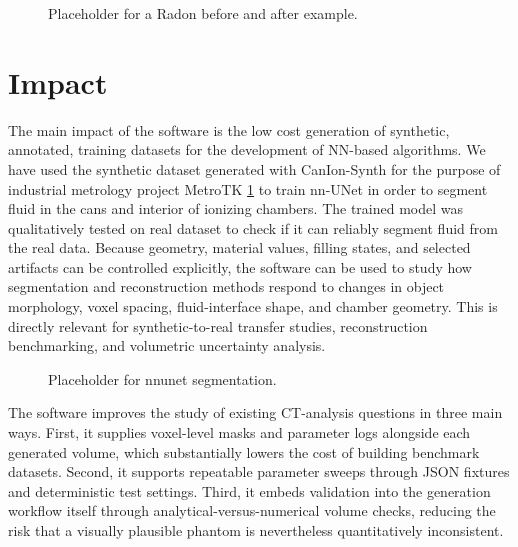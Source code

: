 \documentclass[preprint,12pt, a4paper]{elsarticle}
\begin{document}
\begin{figure}[!h]
\centering
{}
\caption{Placeholder for a Radon before and after example.}
\label{fig: radon_example}
\end{figure}


\section{Impact}
The main impact of the software is the low cost generation of synthetic, annotated, training datasets for the development of NN-based algorithms. We have used the synthetic dataset generated with CanIon-Synth for the purpose of industrial metrology project MetroTK \ref{} to train nn-UNet in order to segment fluid in the cans and interior of ionizing chambers. The trained model was qualitatively tested on real dataset to check if it can reliably segment fluid from the real data.
Because geometry, material values, filling states, and selected artifacts can be controlled explicitly, the software can be used to study how segmentation and reconstruction methods respond to changes in object morphology, voxel spacing, fluid-interface shape, and chamber geometry. This is directly relevant for synthetic-to-real transfer studies, reconstruction benchmarking, and volumetric uncertainty analysis.

\begin{figure}[!h]
\centering
{}
\caption{Placeholder for nnunet segmentation.}
\label{fig: segmentation_example}
\end{figure}

The software improves the study of existing CT-analysis questions in three main ways. First, it supplies voxel-level masks and parameter logs alongside each generated volume, which substantially lowers the cost of building benchmark datasets. Second, it supports repeatable parameter sweeps through JSON fixtures and deterministic test settings. Third, it embeds validation into the generation workflow itself through analytical-versus-numerical volume checks, reducing the risk that a visually plausible phantom is nevertheless quantitatively inconsistent.
\end{document}
